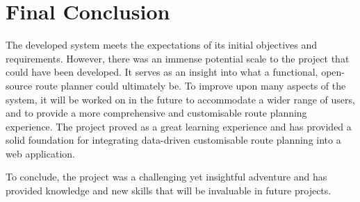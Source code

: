 \label{reflection-and-conclusion:final-conclusion}
\section{Final Conclusion}

The developed system meets the expectations of its initial objectives and requirements. However, there was an immense potential scale to the project that could have been developed. It serves as an insight into what a functional, open-source route planner could ultimately be. To improve upon many aspects of the system, it will be worked on in the future to accommodate a wider range of users, and to provide a more comprehensive and customisable route planning experience. The project proved as a great learning experience and has provided a solid foundation for integrating data-driven customisable route planning into a web application.

To conclude, the project was a challenging yet insightful adventure and has provided knowledge and new skills that will be invaluable in future projects. 
